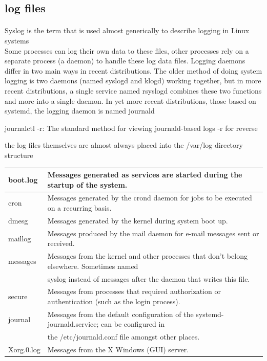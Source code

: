 \documentclass[10pt]{article}
\begin{document}
\subsection{log files}
\paragraph{}
Syslog is the term that is used almost generically to describe logging in Linux systems\\
Some processes can log their own data to these files, other processes rely on a separate process (a daemon) to handle these log data files.
Logging daemons differ in two main ways in recent distributions. The older method of doing system logging is two daemons (named syslogd and klogd) working together, but in more recent distributions, a single service named rsyslogd combines these two functions and more into a single daemon.
In yet more recent distributions, those based on systemd, the logging daemon is named journald\\
\begin{center}
	journalctl -r:  The standard method for viewing journald-based logs -r for reverse\\
\end{center}
the log files themselves are almost always placed into the /var/log directory structure
\begin{center}
	\begin{tabular}{|l|l|}

		\hline boot.log			&Messages generated as services are started during the startup of the system.
		\\ \hline	cron		&Messages generated by the crond daemon for jobs to be executed on a recurring basis.
		\\ \hline	dmesg		&Messages generated by the kernel during system boot up.
		\\ \hline	maillog		&Messages produced by the mail daemon for e-mail messages sent or received.
		\\ \hline	messages	&Messages from the kernel and other processes that don't belong elsewhere. Sometimes named\\
								&syslog instead of messages after the daemon that writes this file.
		\\ \hline	secure		&Messages from processes that required authorization or authentication (such as the login process).
		\\ \hline	journal		&Messages from the default configuration of the systemd-journald.service; can be configured in\\
								&the /etc/journald.conf file amongst other places.
		\\ \hline	Xorg.0.log	&Messages from the X Windows (GUI) server.\\
		\hline
	\end{tabular}
\end{center}
\end{document}

